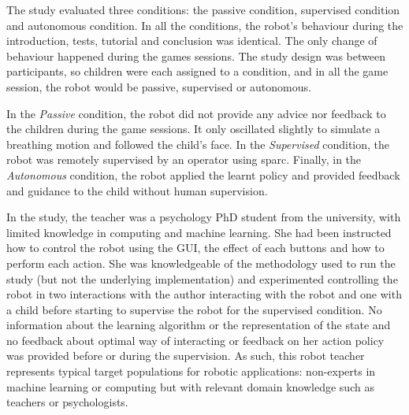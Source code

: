 
The study evaluated three conditions: the passive condition, supervised condition and autonomous condition. In all the conditions, the robot's behaviour during the introduction, tests, tutorial and conclusion was identical. The only change of behaviour happened during the games sessions. The study design was between participants, so children were each assigned to a condition, and in all the game session, the robot would be passive, supervised or autonomous. %

In the \textit{Passive} condition, the robot did not provide any advice nor feedback to the children during the game sessions. It only oscillated slightly to simulate a breathing motion and followed the child's face. In the \textit{Supervised} condition, the robot was remotely supervised by an operator using \gls{sparc}. Finally, in the \textit{Autonomous} condition, the robot applied the learnt policy and provided feedback and guidance to the child without human supervision.

In the study, the teacher was a psychology PhD student from the university, with limited knowledge in computing and machine learning. She had been instructed how to control the robot using the GUI, the effect of each buttons and how to perform each action. She was knowledgeable of the methodology used to run the study (but not the underlying implementation) and experimented controlling the robot in two interactions with the author interacting with the robot and one with a child before starting to supervise the robot for the supervised condition. No information about the learning algorithm or the representation of the state and no feedback about optimal way of interacting or feedback on her action policy was provided before or during the supervision. As such, this robot teacher represents typical target populations for robotic applications: non-experts in machine learning or computing but with relevant domain knowledge such as teachers or psychologists.

